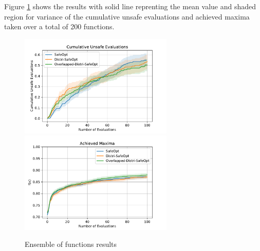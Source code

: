 Figure \ref{fig:gp-sample-result} shows the results with solid line reprenting the mean value and shaded region for variance of the cumulative unsafe evaluations and achieved maxima taken over a total of 200 functions.
\begin{figure}[H]
	\centering
	\includegraphics[width=0.65\textwidth]{figures/results/gp-sample-unsafe.pdf}
	\includegraphics[width=0.65\textwidth]{figures/results/gp-sample-maxima.pdf}
	\caption{Ensemble of functions results}
	\label{fig:gp-sample-result}
\end{figure}


